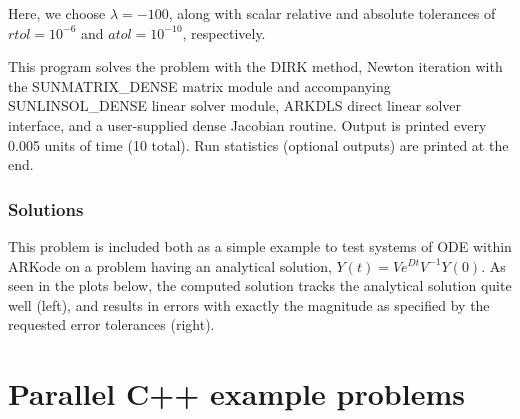 \documentclass[letterpaper,10pt,english]{sphinxmanual}
\begin{document}
Here, we choose \(\lambda = -100\), along with scalar relative and
absolute tolerances of \(rtol=10^{-6}\) and \(atol=10^{-10}\),
respectively.

This program solves the problem with the DIRK method,
Newton iteration with the SUNMATRIX\_DENSE matrix module and
accompanying SUNLINSOL\_DENSE linear solver module, ARKDLS direct
linear solver interface, and a user-supplied dense Jacobian
routine.  Output is printed every 0.005 units of time (10 total).
Run statistics (optional outputs) are printed at the end.


\subsection{Solutions}
\label{\detokenize{cpp_serial:solutions}}
This problem is included both as a simple example to test systems of
ODE within ARKode on a problem having an analytical solution,
\(Y(t) = V e^{Dt} V^{-1} Y(0)\).  As seen in the plots below, the
computed solution tracks the analytical solution quite well (left),
and results in errors with exactly the magnitude as specified by the
requested error tolerances (right).

\noindent{}

\noindent{}


\chapter{Parallel C++ example problems}
\label{\detokenize{cpp_parallel:parallel-cpp}}\label{\detokenize{cpp_parallel::doc}}\label{\detokenize{cpp_parallel:parallel-c-example-problems}}
\end{document}
